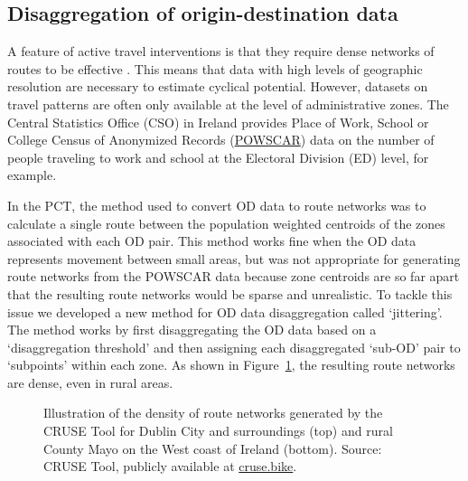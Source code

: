 \documentclass[
  super,
  preprint,
  3p]{elsarticle}
\begin{document}
\subsection{Disaggregation of origin-destination
data}\label{sec-disaggregation}

A feature of active travel interventions is that they require dense
networks of routes to be effective \citep{parkin2018}. This means that
data with high levels of geographic resolution are necessary to estimate
cyclical potential. However, datasets on travel patterns are often only
available at the level of administrative zones. The Central Statistics
Office (CSO) in Ireland provides Place of Work, School or College Census
of Anonymized Records
(\href{https://www.cso.ie/en/census/census2016reports/powscar/}{POWSCAR})
data on the number of people traveling to work and school at the
Electoral Division (ED) level, for example.

In the PCT, the method used to convert OD data to route networks was to
calculate a single route between the population weighted centroids of
the zones associated with each OD pair. This method works fine when the
OD data represents movement between small areas, but was not appropriate
for generating route networks from the POWSCAR data because zone
centroids are so far apart that the resulting route networks would be
sparse and unrealistic. To tackle this issue we developed a new method
for OD data disaggregation called `jittering'. The method works by first
disaggregating the OD data based on a `disaggregation threshold' and
then assigning each disaggregated `sub-OD' pair to `subpoints' within
each zone. As shown in Figure~\ref{fig-dublin}, the resulting route
networks are dense, even in rural areas.

\begin{figure}


\caption{\label{fig-dublin}Illustration of the density of route networks
generated by the CRUSE Tool for Dublin City and surroundings (top) and
rural County Mayo on the West coast of Ireland (bottom). Source: CRUSE
Tool, publicly available at \href{https://cruse.bike/}{cruse.bike}.}

\end{figure}%
\end{document}
